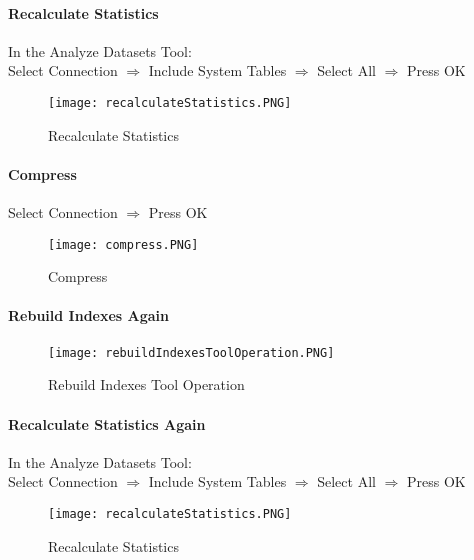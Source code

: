 \documentclass[class=article , crop=false, titlepage, twoside, multi={itemize, figure, verbatim}, float=false]{standalone}
\begin{document}
\paragraph[Recalculate Statistics]{Recalculate Statistics\texorpdfstring{\\}{}}
\noindent In the Analyze Datasets Tool:\\
\noindent Select Connection $\Rightarrow$  Include System Tables $\Rightarrow$ Select All $\Rightarrow$ Press OK
\begin{figure}[h!]
\centering
	\texttt{[image: recalculateStatistics.PNG]}
\caption{Recalculate Statistics}
\end{figure}
\clearpage
\paragraph[Compress]{Compress\texorpdfstring{\\}{}}
\noindent  Select Connection $\Rightarrow$  Press OK
\begin{figure}[h!]
\centering
	\texttt{[image: compress.PNG]}
\caption{Compress}
\end{figure}
\clearpage
\paragraph{Rebuild Indexes Again}
\begin{figure}[h!]
\centering
	\texttt{[image: rebuildIndexesToolOperation.PNG]}
\caption{Rebuild Indexes Tool Operation}
\end{figure}
\clearpage
\paragraph[Recalculate Statistics]{Recalculate Statistics Again\texorpdfstring{\\}{}}
\noindent In the Analyze Datasets Tool:\\
\noindent Select Connection $\Rightarrow$  Include System Tables $\Rightarrow$ Select All $\Rightarrow$ Press OK
\begin{figure}[h!]
\centering
	\texttt{[image: recalculateStatistics.PNG]}
\caption{Recalculate Statistics}
\end{figure}
\clearpage
\end{document}
